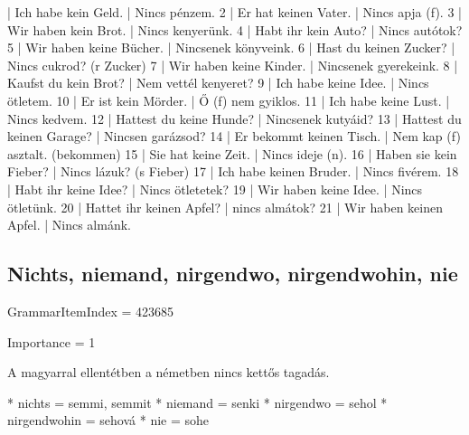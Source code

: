 \documentclass{article}
\newenvironment{desc}{\verbatim}{\endverbatim}
\newenvironment{exmp}{\verbatim}{\endverbatim}
\begin{document}
\begin{exmp}
1 | Ich habe kein Geld. | Nincs pénzem.
2 | Er hat keinen Vater. | Nincs apja (f).
3 | Wir haben kein Brot. | Nincs kenyerünk.
4 | Habt ihr kein Auto? | Nincs autótok?
5 | Wir haben keine Bücher. | Nincsenek könyveink.
6 | Hast du keinen Zucker? | Nincs cukrod? (r Zucker)
7 | Wir haben keine Kinder. | Nincsenek gyerekeink.
8 | Kaufst du kein Brot? | Nem vettél kenyeret?
9 | Ich habe keine Idee. | Nincs ötletem.
10 | Er ist kein Mörder. | Ő (f) nem gyiklos.
11 | Ich habe keine Lust. | Nincs kedvem.
12 | Hattest du keine Hunde? | Nincsenek kutyáid?
13 | Hattest du keinen Garage? | Nincsen garázsod?
14 | Er bekommt keinen Tisch. | Nem kap (f) asztalt. (bekommen)
15 | Sie hat keine Zeit. | Nincs ideje (n).
16 | Haben sie kein Fieber? | Nincs lázuk? (s Fieber)
17 | Ich habe keinen Bruder. | Nincs fivérem.
18 | Habt ihr keine Idee? | Nincs ötletetek?
19 | Wir haben keine Idee. | Nincs ötletünk.
20 | Hattet ihr keinen Apfel? | nincs almátok?
21 | Wir haben keinen Apfel. | Nincs almánk.
\end{exmp}

\subsection{Nichts, niemand, nirgendwo, nirgendwohin, nie}

GrammarItemIndex = 423685

Importance = 1

\begin{desc}
A magyarral ellentétben a németben nincs kettős tagadás.

* nichts = semmi, semmit
* niemand = senki
* nirgendwo = sehol
* nirgendwohin = sehová
* nie = sohe
\end{desc}
\end{document}

